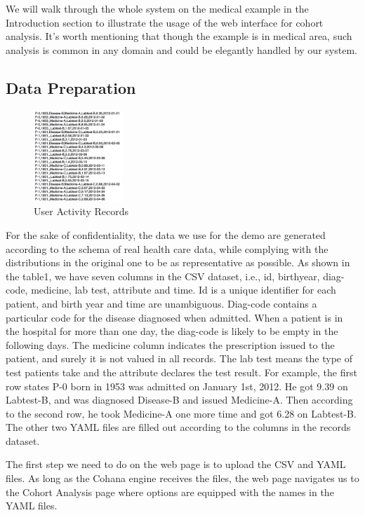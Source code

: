 \documentclass[10pt,conference,letterpaper]{IEEEtran}
\begin{document}
We will walk through the whole system on the medical example in the Introduction section to illustrate the usage of the web interface for cohort analysis. It's worth mentioning that though the example is in medical area, such analysis is common in any domain and could be elegantly handled by our system.

\subsection{Data Preparation}

\begin{figure}
    \centering
    \includegraphics[width=0.3\textwidth]{records.png}
    \caption{User Activity Records}
    \label{fig:records}
\end{figure}

For the sake of confidentiality, the data we use for the demo are generated according to the schema of real health care data, while complying with the distributions in the original one to be as representative as possible. As shown in the table1, we have seven columns in the CSV dataset, i.e., id, birthyear, diag-code, medicine, lab test, attribute and time. Id is a unique identifier for each patient, and birth year and time are unambiguous. Diag-code contains a particular code for the disease diagnosed when admitted. When a patient is in the hospital for more than one day, the diag-code is likely to be empty in the following days. The medicine column indicates the prescription issued to the patient, and surely it is not valued in all records. The lab test means the type of test patients take and the attribute declares the test result. For example, the first row states P-0 born in 1953 was admitted on January 1st, 2012. He got 9.39 on Labtest-B, and was diagnosed Disease-B and issued Medicine-A. Then according to the second row, he took Medicine-A one more time and got 6.28 on Labtest-B. The other two YAML files are filled out according to the columns in the records dataset.

The first step we need to do on the web page is to upload the CSV and YAML files. As long as the Cohana engine receives the files, the web page navigates us to the Cohort Analysis page where options are equipped with the names in the YAML files.
\end{document}
